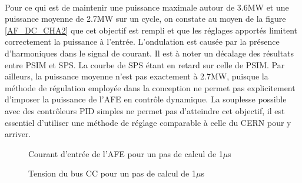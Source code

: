 \paragraph{} Pour ce qui est de maintenir une puissance maximale autour de 3.6MW et une puissance moyenne de 2.7MW sur un cycle, on constate au moyen de la figure \ref{AF_DC_CHA2} que cet objectif est rempli et que les réglages apportés limitent correctement la puissance à l'entrée. L'ondulation est causée par la présence d'harmoniques dans le signal de courant. Il est à noter un décalage des résultats entre PSIM et SPS. La courbe de SPS étant en retard sur celle de PSIM. Par ailleurs, la puissance moyenne n'est pas exactement à 2.7MW, puisque la méthode de régulation employée dans la conception ne permet pas explicitement d'imposer la puissance de l'AFE en contrôle dynamique. La souplesse possible avec des contrôleurs PID simples ne permet pas d'atteindre cet objectif, il est essentiel d'utiliser une méthode de réglage comparable à celle du CERN pour y arriver.



\begin{figure}[htb]
\centering
{}
\caption{Courant d'entrée de l'AFE pour un pas de calcul de 1$\mu$s}
\label{AF_DC_cou1}
\end{figure}


\begin{figure}[htb]
\centering
{}
\caption{Tension du bus CC pour un pas de calcul de 1$\mu$s}
\label{AF_DC_vch1}
\end{figure}

